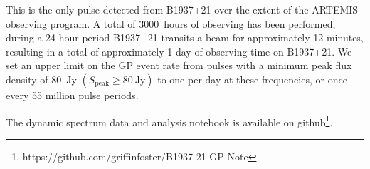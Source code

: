 \documentclass[RNAAS]{aastex62}
\begin{document}
This is the only pulse detected from B1937+21 over the extent of the ARTEMIS
observing program. A total of 3000~hours of observing has been performed, during
a 24-hour period B1937+21 transits a beam for approximately 12 minutes,
resulting in a total of approximately 1 day of observing time on B1937+21. We
set an upper limit on the GP event rate from pulses with a minimum peak flux
density of 80~Jy $(S_{\textrm{peak}} \geq 80~\textrm{Jy})$ to one per day at
these frequencies, or once every 55 million pulse periods.

The dynamic spectrum data and analysis notebook is available on
github\footnote{https://github.com/griffinfoster/B1937-21-GP-Note}.



\end{document}
